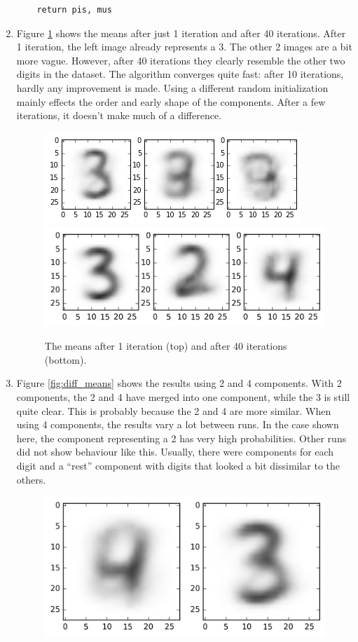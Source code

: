 \documentclass[a4paper]{article}
\begin{document}
\begin{enumerate}
\begin{lstlisting}
    return pis, mus
\end{lstlisting}

\item Figure \ref{fig:means} shows the means after just 1 iteration and after 40 iterations. After 1 iteration, the left image already represents a 3. The other 2 images are a bit more vague. However, after 40 iterations they clearly resemble the other two digits in the dataset. The algorithm converges quite fast: after 10 iterations, hardly any improvement is made. Using a different random initialization mainly effects the order and early shape of the components. After a few iterations, it doesn't make much of a difference.

\begin{figure}
\centering
\includegraphics[width=.6\linewidth]{figures/means_init.png} \\
\includegraphics[width=.6\linewidth]{figures/means.png}
\caption{The means after 1 iteration (top) and after 40 iterations (bottom).}
\label{fig:means}
\end{figure}
\item Figure \ref{fig:diff_means} shows the results using 2 and 4 components. With 2 components, the 2 and 4 have merged into one component, while the 3 is still quite clear. This is probably because the 2 and 4 are more similar. When using 4 components, the results vary a lot between runs. In the case shown here, the component representing a 2 has very high probabilities. Other runs did not show behaviour like this. Usually, there were components for each digit and a ``rest'' component with digits that looked a bit dissimilar to the others.
\begin{figure}
\centering
\includegraphics[width=.6\linewidth]{figures/means2.png} \\

\end{figure}
\end{enumerate}
\end{document}
